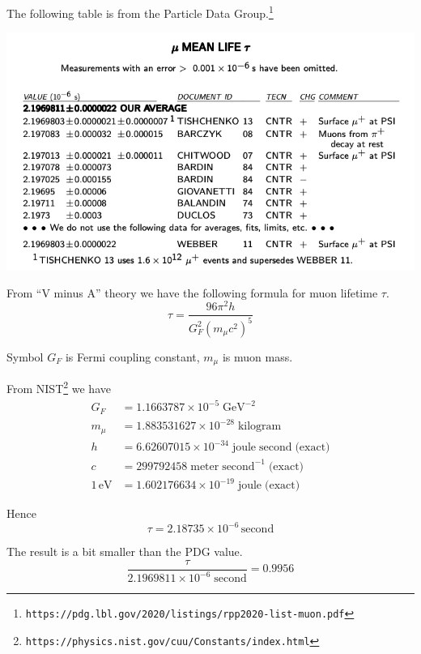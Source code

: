 \documentclass[12pt]{article}
\begin{document}
\noindent
The following table is from the Particle Data Group.\footnote{\tt https://pdg.lbl.gov/2020/listings/rpp2020-list-muon.pdf}

\begin{center}
\includegraphics[scale=0.5]{muon-mean-life.png}
\end{center}

\noindent
From ``V minus A'' theory we have the following formula for muon lifetime $\tau$.
\begin{equation*}
\tau=\frac{96\pi^2h}{G_F^2\left(m_\mu c^2\right)^5}
\end{equation*}

\noindent
Symbol $G_F$ is Fermi coupling constant, $m_\mu$ is muon mass.

\bigskip
\noindent
From NIST\footnote{\tt https://physics.nist.gov/cuu/Constants/index.html} we have
\begin{align*}
G_F&=1.1663787\times10^{-5}\;\text{GeV}^{-2}
\\
m_\mu&=1.883531627\times10^{-28}\;\text{kilogram}
\\
h&=6.62607015\times10^{-34}\;\text{joule}\;\text{second}\;\text{(exact)}
\\
c&=299792458\;\text{meter}\;\text{second}^{-1}\;\text{(exact)}
\\
1\,\text{eV}&=1.602176634\times10^{-19}\;\text{joule}\;\text{(exact)}
\end{align*}

\noindent
Hence
\begin{equation*}
\tau=2.18735\times10^{-6}\,\text{second}
\end{equation*}

\noindent
The result is a bit smaller than the PDG value.
\begin{equation*}
\frac{\tau}{2.1969811\times10^{-6}\;\text{second}}=0.9956
\end{equation*}
\end{document}
